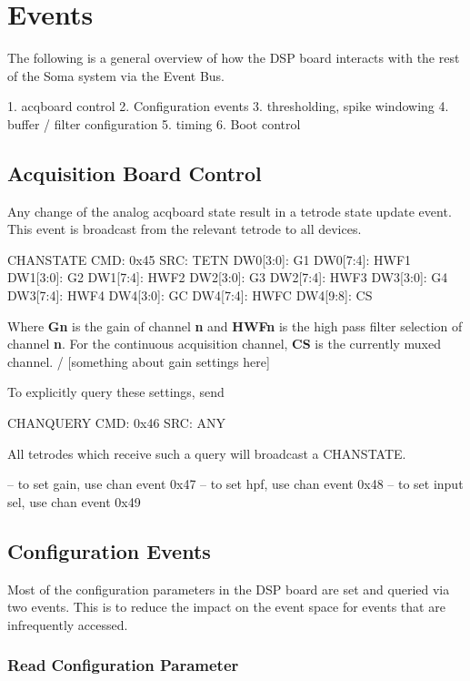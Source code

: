 \section{Events}
The following is a general overview of how the DSP board interacts with the rest of the Soma system via the Event Bus. 

1. acqboard control
2. Configuration events
3. thresholding, spike windowing
4. buffer / filter configuration
5. timing 
6. Boot control

\subsection{Acquisition Board Control}
Any change of the analog acqboard state result in a tetrode state update event. This event is broadcast from the relevant tetrode to all devices. 

\begin{event}{CHANSTATE}
CMD: 0x45
SRC: TETN
DW0[3:0]: G1
DW0[7:4]: HWF1
DW1[3:0]: G2
DW1[7:4]: HWF2
DW2[3:0]: G3
DW2[7:4]: HWF3
DW3[3:0]: G4
DW3[7:4]: HWF4
DW4[3:0]: GC
DW4[7:4]: HWFC
DW4[9:8]: CS
\end{event}


Where \textbf{Gn} is the gain of channel \textbf{n} and \textbf{HWFn} is the high pass filter selection of channel \textbf{n}. For the continuous acquisition channel, \textbf{CS} is the currently muxed channel. 
/
[something about gain settings here] 

To explicitly query these settings, send 

\begin{event}{CHANQUERY}
CMD: 0x46
SRC: ANY
\end{event}


All tetrodes which receive such a query will broadcast a CHANSTATE. 

-- to set gain, use chan event 0x47
-- to set hpf, use chan event 0x48
-- to set input sel, use chan event 0x49



\subsection{Configuration Events}
Most of the configuration parameters in the DSP board are set and queried via two events. This is to reduce the impact on the event space for events that are infrequently accessed. 

\subsubsection{Read Configuration Parameter}

